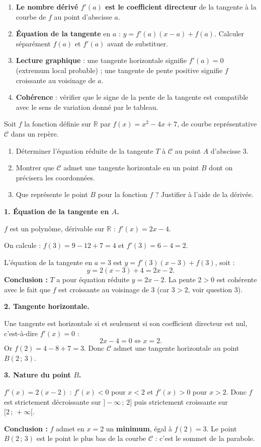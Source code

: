 \documentclass[11pt]{article}
\begin{document}
\begin{methode}
\begin{enumerate}
\item \textbf{Le nombre dérivé $f'(a)$ est le coefficient directeur} de la tangente à la courbe de $f$ au point d'abscisse $a$.
\item \textbf{Équation de la tangente} en $a$ : $y = f'(a)(x - a) + f(a)$. Calculer séparément $f(a)$ et $f'(a)$ avant de substituer.
\item \textbf{Lecture graphique} : une tangente horizontale signifie $f'(a) = 0$ (extremum local probable) ; une tangente de pente positive signifie $f$ croissante au voisinage de $a$.
\item \textbf{Cohérence} : vérifier que le signe de la pente de la tangente est compatible avec le sens de variation donné par le tableau.
\end{enumerate}
\end{methode}

\begin{exoresolu}
Soit $f$ la fonction définie sur $\mathbb{R}$ par $f(x) = x^2 - 4x + 7$, de courbe représentative $\mathcal{C}$ dans un repère.
\begin{enumerate}
\item Déterminer l'équation réduite de la tangente $T$ à $\mathcal{C}$ au point $A$ d'abscisse $3$.
\item Montrer que $\mathcal{C}$ admet une tangente horizontale en un point $B$ dont on précisera les coordonnées.
\item Que représente le point $B$ pour la fonction $f$ ? Justifier à l'aide de la dérivée.
\end{enumerate}
\tcblower
\textbf{1. Équation de la tangente en $A$.}

$f$ est un polynôme, dérivable sur $\mathbb{R}$ : $f'(x) = 2x - 4$.

On calcule : $f(3) = 9 - 12 + 7 = 4$ et $f'(3) = 6 - 4 = 2$.

L'équation de la tangente en $a = 3$ est $y = f'(3)(x-3) + f(3)$, soit :
\[ y = 2(x-3) + 4 = 2x - 2. \]
\textbf{Conclusion :} $T$ a pour équation réduite $y = 2x - 2$. La pente $2 > 0$ est cohérente avec le fait que $f$ est croissante au voisinage de $3$ (car $3 > 2$, voir question 3).

\textbf{2. Tangente horizontale.}

Une tangente est horizontale si et seulement si son coefficient directeur est nul, c'est-à-dire $f'(x) = 0$ :
\[ 2x - 4 = 0 \iff x = 2. \]
Or $f(2) = 4 - 8 + 7 = 3$. Donc $\mathcal{C}$ admet une tangente horizontale au point $B(2\,;\,3)$.

\textbf{3. Nature du point $B$.}

$f'(x) = 2(x-2)$ : $f'(x) < 0$ pour $x < 2$ et $f'(x) > 0$ pour $x > 2$. Donc $f$ est strictement décroissante sur $]-\infty\,;\,2]$ puis strictement croissante sur $[2\,;\,+\infty[$.

\textbf{Conclusion :} $f$ admet en $x = 2$ un \textbf{minimum}, égal à $f(2) = 3$. Le point $B(2\,;\,3)$ est le point le plus bas de la courbe $\mathcal{C}$ : c'est le sommet de la parabole.
\end{exoresolu}
\end{document}
